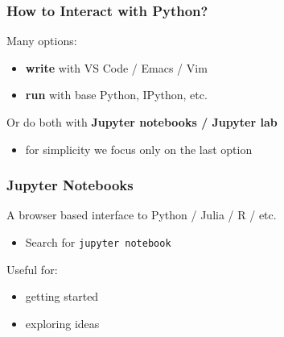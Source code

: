 \documentclass[
    xcolor={svgnames,dvipsnames},
    hyperref={colorlinks, citecolor=DeepPink4, linkcolor=DarkRed, urlcolor=DarkBlue}
    ]{beamer}  %
\newcommand{\emp}[1]{\textcolor{DarkOrange1}{\bf #1}}
\newcommand{\1}{\mathbbm 1}
\begin{document}
\begin{frame}
    \frametitle{How to Interact with Python?}

    Many options:

    \begin{itemize}
        \item \emp{write} with VS Code / Emacs / Vim
            \vspace{0.5em}
        \item \emp{run} with base Python, IPython, etc.
    \end{itemize}

            \vspace{0.5em}
            \vspace{0.5em}
            \vspace{0.5em}
        Or do both with \emp{Jupyter notebooks / Jupyter lab}

            \vspace{0.5em}
    \begin{itemize}
        \item for simplicity we focus only on the last option
    \end{itemize}

\end{frame}


\begin{frame}
    \frametitle{Jupyter Notebooks}

    A browser based interface to Python / Julia / R / etc.


    \vspace{2em}

    \begin{itemize}
        \item Search for \texttt{jupyter notebook}
    \end{itemize}

    \vspace{2em}

    Useful for:

    \begin{itemize}
        \item getting started
        \item exploring ideas
    \end{itemize}

\end{frame}
\end{document}
